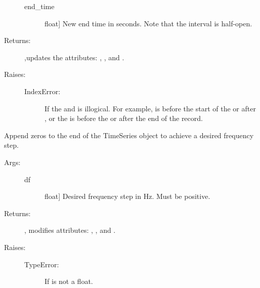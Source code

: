 \documentclass[letterpaper,10pt,english]{sphinxmanual}
\begin{document}
\begin{fulllineitems}
\begin{fulllineitems}
\begin{description}
\begin{description}
\item[{end\_time}] \leavevmode{[}float{]}
New end time in seconds. Note that the interval is
half-open.

\end{description}

\item[{Returns:}] \leavevmode
{},updates the attributes: , , and
.

\item[{Raises:}] \leavevmode\begin{description}
\item[{IndexError:}] \leavevmode
If the  and  is illogical.
For example,  is before the start of the
 or after , or the  is
before the  or after the end of the record.

\end{description}

\end{description}

\end{fulllineitems}


\begin{fulllineitems}
\label{\detokenize{index:sigpropy.TimeSeries.zero_pad}}
Append zeros to the end of the TimeSeries object to achieve a
desired frequency step.
\begin{description}
\item[{Args:}] \leavevmode\begin{description}
\item[{df}] \leavevmode{[}float{]}
Desired frequency step in Hz. Must be positive.

\end{description}

\item[{Returns:}] \leavevmode
{}, modifies attributes: , , and
.

\item[{Raises:}] \leavevmode\begin{description}
\item[{TypeError:}] \leavevmode
If  is not a float.


\end{description}
\end{description}
\end{fulllineitems}
\end{fulllineitems}
\end{document}
